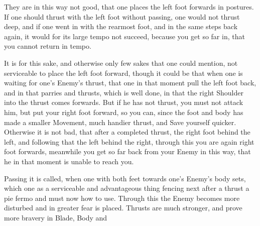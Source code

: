 They are in this way not good, that one places the left foot forwards
in postures. If one should thrust with the left foot without passing,
one would not thrust deep, and if one went in with the rearmost foot,
and in the same steps back again, it would for its large tempo not
succeed, because you get so far in, that you cannot return in tempo.


It is for this sake, and otherwise only few sakes that one could
mention, not serviceable to place the left foot forward, though it
could be that when one is waiting for one's Enemy's thrust, that one
in that moment pull the left foot back, and in that parries and
thrusts, which is well done, in that the right Shoulder into the thrust
comes forwards. But if he has not thrust, you must not attack him, but
put your right foot forward, so you can, since the foot and body has
made a smaller Movement, much handier thrust, and Save yourself
quicker. Otherwise it is not bad, that after a completed thrust, the
right foot behind the left, and following that the left behind the
right, through this you are again right foot forwards, meanwhile you
get so far back from your Enemy in this way, that he in that moment is
unable to reach you.




Passing it is called, when one with both feet towards one's Enemy's
body sets, which one as a serviceable and advantageous thing fencing
next after a thrust a pie fermo and must now how to use. Through this
the Enemy becomes more disturbed and in greater fear is
placed. Thrusts are much stronger, and prove more
bravery in Blade, Body and
